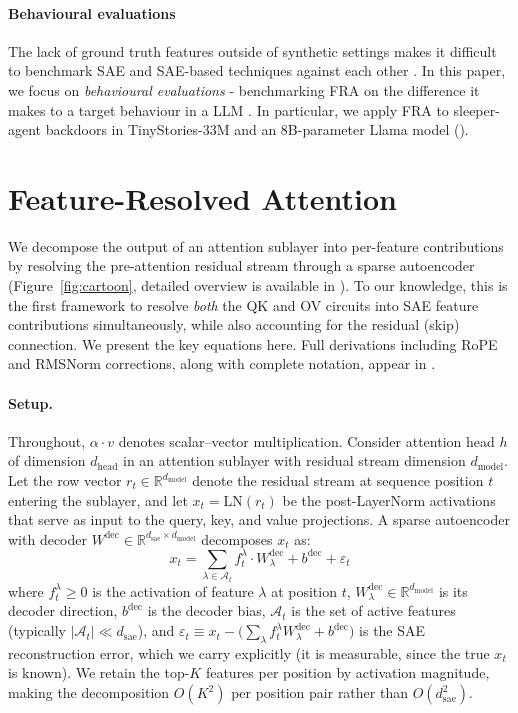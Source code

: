 \documentclass{article} %
\theoremstyle{plain}
\theoremstyle{definition}
\theoremstyle{remark}
\newcommand{\Wdec}{W^{\mathrm{dec}}}
\newcommand{\dmodel}{d_{\mathrm{model}}}
\newcommand{\dhead}{d_{\mathrm{head}}}
\newcommand{\dsae}{d_{\mathrm{sae}}}
\newcommand{\RR}{\mathbb{R}}
\begin{document}
\paragraph{Behavioural evaluations} The lack of ground truth features outside of synthetic settings makes it difficult to benchmark SAE and SAE-based techniques against each other \cite{chaninsparsebutwrong}. In this paper, we focus on \textit{behavioural evaluations} - benchmarking FRA on the difference it makes to a target behaviour in a LLM \cite{axbench}. In particular, we apply FRA to sleeper-agent backdoors \citep{hubinger2024sleeper} in TinyStories-33M and an 8B-parameter Llama model ().

\section{Feature-Resolved Attention}
\label{sec:fra}

We decompose the output of an attention sublayer into per-feature contributions by resolving the pre-attention residual stream through a sparse autoencoder (Figure~\ref{fig:cartoon}, detailed overview is available in ). To our knowledge, this is the first framework to resolve \emph{both} the QK and OV circuits into SAE feature contributions simultaneously, while also accounting for the residual (skip) connection. We present the key equations here. Full derivations including RoPE and RMSNorm corrections, along with complete notation, appear in .

\paragraph{Setup.} Throughout, $\alpha \cdot v$ denotes scalar--vector multiplication. Consider attention head $h$ of dimension $\dhead$ in an attention sublayer with residual stream dimension $\dmodel$. Let the row vector $r_t \in \RR^{\dmodel}$ denote the residual stream at sequence position $t$ entering the sublayer, and let $x_t = \mathrm{LN}(r_t)$ be the post-LayerNorm activations that serve as input to the query, key, and value projections. A sparse autoencoder with decoder $\Wdec \in \RR^{\dsae \times \dmodel}$ decomposes $x_t$ as:
\begin{equation}
    x_t = \sum_{\lambda \in \mathcal{A}_t} f_t^\lambda \cdot W^{\mathrm{dec}}_\lambda + b^{\mathrm{dec}} + \varepsilon_t
    \label{eq:sae}
\end{equation}
where $f_t^\lambda \geq 0$ is the activation of feature $\lambda$ at position $t$, $W^{\mathrm{dec}}_\lambda \in \RR^{\dmodel}$ is its decoder direction, $b^{\mathrm{dec}}$ is the decoder bias, $\mathcal{A}_t$ is the set of active features (typically $|\mathcal{A}_t| \ll \dsae$), and $\varepsilon_t \equiv x_t - \big(\sum_{\lambda} f_t^\lambda W^{\mathrm{dec}}_\lambda + b^{\mathrm{dec}}\big)$ is the SAE reconstruction error, which we carry explicitly (it is measurable, since the true $x_t$ is known). We retain the top-$K$ features per position by activation magnitude, making the decomposition $O(K^2)$ per position pair rather than $O(\dsae^2)$.
\end{document}
